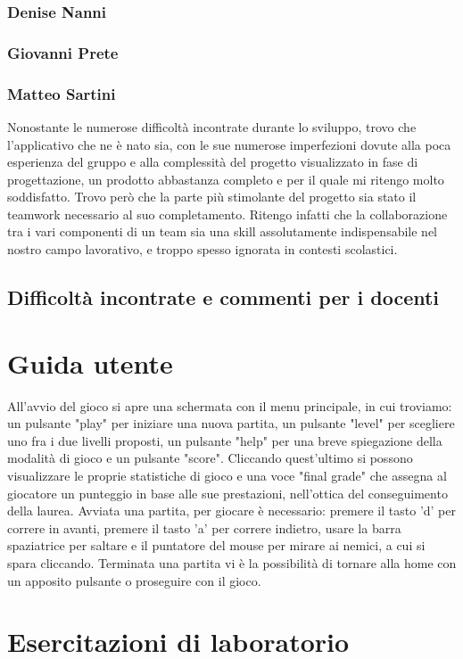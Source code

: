 \documentclass{article}
\begin{document}
\subsubsection{Denise Nanni}
\subsubsection{Giovanni Prete}
\subsubsection{Matteo Sartini}
Nonostante le numerose difficoltà incontrate durante lo sviluppo, trovo che l’applicativo che ne è nato sia, con le sue numerose imperfezioni dovute alla poca esperienza del gruppo e alla complessità del progetto visualizzato in fase di progettazione, un prodotto abbastanza completo e per il quale mi ritengo molto soddisfatto.
Trovo però che la parte più stimolante del progetto sia stato il teamwork necessario al suo completamento. Ritengo infatti che la collaborazione tra i vari componenti di un team sia una skill assolutamente indispensabile nel nostro campo lavorativo, e troppo spesso ignorata in contesti scolastici.
\subsection{Difficoltà incontrate e commenti per i docenti}
\section{Guida utente}
All'avvio del gioco si apre una schermata con il menu principale, in cui troviamo: un pulsante "play" per iniziare una nuova partita, un pulsante "level" per scegliere uno fra i due livelli proposti, un pulsante "help" per una breve spiegazione della modalità di gioco e un pulsante "score". 
Cliccando quest'ultimo si possono visualizzare le proprie statistiche di gioco e una voce "final grade" che assegna al giocatore un punteggio in base alle sue prestazioni, nell'ottica del conseguimento della laurea.
Avviata una partita, per giocare è necessario: premere il tasto 'd' per correre in avanti, premere il tasto 'a' per correre indietro, usare la barra spaziatrice per saltare e il puntatore del mouse per mirare ai nemici, a cui si spara cliccando.
Terminata una partita vi è la possibilità di tornare alla home con un apposito pulsante o proseguire con il gioco.
\section{Esercitazioni di laboratorio}
\end{document}
